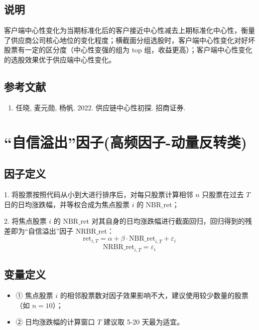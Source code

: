 \documentclass{article}
\begin{document}
\subsection{说明}
客户端中心性变化为当期标准化后的客户接近中心性减去上期标准化中心性，衡量了供应商公司核心地位的变化程度；横截面分组选股时，客户端中心性变化对好坏股票有一定的区分度（中心性变强的组为 top 组，收益更高）；客户端中心性变化的选股效果优于供应端中心性变化。

\subsection{参考文献}
\begin{enumerate}
    \item 任晓, 麦元勋, 杨帆. 2022. 供应链中心性初探. 招商证券.
\end{enumerate}

\section{“自信溢出”因子(高频因子-动量反转类)}

\subsection{因子定义}

1. 将股票按照代码从小到大进行排序后，对每只股票计算相邻 \( n \) 只股票在过去 \( T \) 日的日均涨跌幅，并等权合成为焦点股票 \( i \) 的 \( \mathrm{NBR\_ret} \)；

2. 将焦点股票 \( i \) 的 \( \mathrm{NBR\_ret} \) 对其自身的日均涨跌幅进行截面回归，回归得到的残差即为“自信溢出”因子 \( \mathrm{NRBR\_ret} \)：
\begin{equation}
    \mathrm{ret}_{i,T} = \alpha + \beta \cdot \mathrm{NBR\_ret}_{i,T} + \varepsilon_i
\end{equation}
\begin{equation}
    \mathrm{NRBR\_ret}_{i,T} = \varepsilon_i
\end{equation}

\subsection{变量定义}
\begin{itemize}
    \item ① 焦点股票 \( i \) 的相邻股票数对因子效果影响不大，建议使用较少数量的股票（如 \( n=10 \)）；
    \item ② 日均涨跌幅的计算窗口 \( T \) 建议取 5-20 天最为适宜。
\end{itemize}
\end{document}
